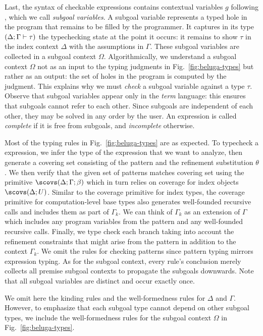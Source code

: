 Last, the syntax of checkable expressions contains contextual variables $g$ following
\cite{Nanevski:ICML05,Boespflug:LFMTP11}, which we call
\emph{subgoal variables}.
A subgoal variable represents a typed hole in the program that remains to be
filled by the programmer.
It captures in its type $(\Delta; \Gamma \vdash \tau)$ the typechecking state at the point it occurs:
it remains to show $\tau$ in the index context $\Delta$ with the assumptions in
$\Gamma$.
These subgoal variables are collected in a subgoal context $\Omega$.
Algorithmically, we understand a subgoal context $\Omega$ not as an input to the
typing judgments in Fig.~\ref{fig:beluga-types} but rather as an output: the set
of holes in the program is computed by the judgment.
This explains why we must \emph{check} a subgoal variable against a type $\tau$.
Observe that subgoal variables appear only in the \emph{term} language: this
ensures that subgoals cannot refer to each other.
Since subgoals are independent of each other, they may be solved in any order by
the user.
An expression is called \emph{complete} if it is free from subgoals, and
\emph{incomplete} otherwise.

Most of the typing rules in Fig.~\ref{fig:beluga-types} are as expected.
To typecheck a \tcases expression, we infer the type of the expression that we
want to analyze, then generate a covering set consisting of the pattern and the
refinement substitution $\theta$.
We then verify that the given set of patterns matches covering set using the
primitive $\scovs(\Delta;\Gamma;\beta)$ which in turn relies on coverage for
index objects $\scovs(\Delta;U)$.
Similar to the coverage primitive for index types, the coverage primitive for
computation-level base types also generates well-founded recursive calls and
includes them as part of $\Gamma_k$.
We can think of $\Gamma_k$ as an extension of $\Gamma$
which includes any program variables from the pattern and any well-founded
recursive calls.
Finally, we type check each branch taking into account the refinement
constraints that might arise from the pattern in addition to the
context $\Gamma_k$.
We omit the rules for checking patterns since pattern typing mirrors expression
typing.
As for the subgoal context, every rule's conclusion merely collects all premise
subgoal contexts to propagate the subgoals downwards.
Note that all subgoal variables are distinct and occur exactly once.

We omit here the kinding rules and the well-formedness rules for
$\Delta$ and $\Gamma$. However, to emphasize that each subgoal type
cannot depend on other subgoal types, we include the well-formedness
rules for the subgoal context $\Omega$ in Fig.~\ref{fig:beluga-types}.

